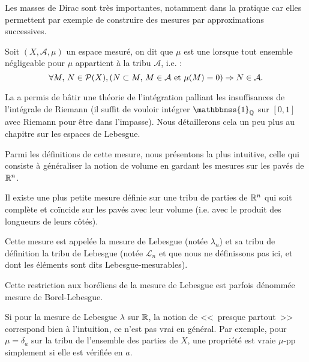 Les masses de Dirac sont très importantes, notamment dans la pratique car elles permettent par exemple
de construire des mesures par approximations successives.


\begin{definition}
Soit $(X,\mathcal{A},\mu)$ un espace mesuré,
on dit que $\mu$ est une 
lorsque tout ensemble négligeable pour $\mu$ appartient à la tribu $\mathcal{A}$, i.e. :
\begin{equation}
\forall M,\, N\in\mathcal{P}(X), \left(N\subset M,\, M\in\mathcal{A}\hbox{ et }\mu(M)=0\right)\Rightarrow N\in\mathcal{A}.
\end{equation}
\end{definition}

\medskip
La 
a permis de bâtir une théorie de
l'intégration palliant les insuffisances de l'intégrale de Riemann (il suffit de vouloir
intégrer $\mathbbmss{1}_{\QQ}$ sur $[0,1]$ avec Riemann pour être dans l'impasse).
Nous détaillerons cela un peu plus au chapitre sur les espaces de Lebesgue.\label{Sec-impasse}

Parmi les définitions de cette mesure, nous présentons la plus intuitive, celle
qui consiste à généraliser la notion de volume en gardant les mesures sur
les pavés de $\mathbb R^n$.

\begin{definition}
Il existe une plus petite mesure définie sur une tribu de parties de $\mathbb R^n$ qui soit
complète et coïncide sur les pavés avec leur volume (i.e. avec le produit des longueurs de leurs côtés).

Cette mesure est appelée la mesure de Lebesgue (notée $\lambda_n$) et sa tribu de définition
la tribu de Lebesgue (notée  $\mathcal L_n$ et que nous ne définissons pas ici, et dont les éléments
sont dits Lebesgue-mesurables).
\end{definition}

Cette restriction aux boréliens de la mesure de Lebesgue est parfois dénommée mesure de Borel-Lebesgue.

\medskip
Si pour la mesure de Lebesgue $\lambda$ sur $\mathbb R$, la notion de <<~presque partout~>> correspond bien
à l'intuition, ce n'est pas vrai en général.
Par exemple, pour $\mu=\delta_a$ sur la tribu de l'ensemble des parties de $X$, une propriété
est vraie $\mu$-pp simplement si elle est vérifiée en $a$.

